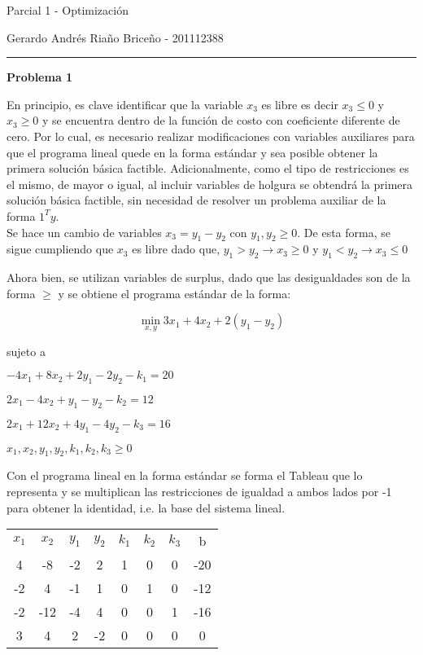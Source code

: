 \documentclass[10pt]{article}
\begin{document}
\begin{center}
\Large{Parcial 1 - Optimizaci\'on}

\Large{Gerardo Andr\'es Ria\~no Brice\~no - 201112388}
\medskip
\hrule
\end{center}

\setlength\parindent{0pt} 

{\bf \Large{Problema 1}}
\medskip

En principio, es clave identificar que la variable $x_3$ es libre es decir $x_3\leq0$ y $x_3\geq0$ y se encuentra dentro de la funci\'on de costo con coeficiente diferente de cero. Por lo cual, es necesario realizar modificaciones con variables auxiliares para que el programa lineal quede en la forma est\'andar y sea posible obtener la primera soluci\'on b\'asica factible. Adicionalmente, como el tipo de restricciones es el mismo, de mayor o igual, al incluir variables de holgura se obtendr\'a la primera soluci\'on b\'asica factible, sin necesidad de resolver un problema auxiliar de la forma $1^Ty$. \\

Se hace un cambio de variables $x_3 = y_1-y_2$ con $y_1, y_2 \geq 0$. De esta forma, se sigue cumpliendo que $x_3$ es libre dado que, $y_1>y_2\rightarrow x_3\geq0$ y $y_1<y_2\rightarrow x_3\leq0$

Ahora bien, se utilizan variables de surplus, dado que las desigualdades son de la forma $\geq$ y se obtiene el programa est\'andar de la forma:

\begin{center}
\[\min_{x,y}  3x_1+4x_2+2(y_1-y_2)\] 

sujeto a

$-4x_1+8x_2+2y_1-2y_2-k_1 = 20$

$2x_1-4x_2+y_1-y_2-k_2 = 12$

$2x_1+12x_2+4y_1-4y_2-k_3 = 16$

$x_1, x_2, y_1, y_2, k_1, k_2, k_3 \geq 0$

\end{center}

Con el programa lineal en la forma est\'andar se forma el Tableau que lo representa y se multiplican las restricciones de igualdad a ambos lados por -1 para obtener la identidad, i.e. la base del sistema lineal.

\begin{center}
\begin{tabular}{c c c c c c c |c}
$x_1$&	$x_2$&	$y_1$&	$y_2$&	$k_1$&	$k_2$&	$k_3$&b\\	
4	&-8&	-2&	2&	1&	0&	0&	-20 \\
-2&	4&	-1&	1&	0	&1&	0&	-12 \\
-2&	-12&	-4&	4&	0	&0&	1&	-16 \\
\hline
3&	4&	2&	-2&	0&	0&	0&	0\\
\end{tabular}
\end{center}
\end{document}
